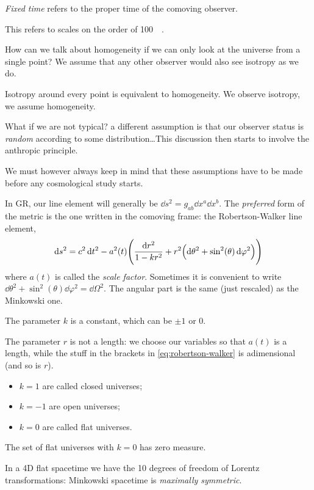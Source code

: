 \documentclass[main.tex]{subfiles}
\begin{document}
\emph{Fixed time} refers to the proper time of the comoving observer.

This refers to scales on the order of \SI{100}{\mega\parsec}.

How can we talk about homogeneity if we can only look at the universe from a single point? We assume that any other observer would also see isotropy as we do.

Isotropy around every point is equivalent to homogeneity. We observe isotropy, we assume homogeneity.

What if we are not typical? a different assumption is that our observer status is \emph{random} according to some distribution\dots This discussion then starts to involve the anthropic principle.

We must however always keep in mind that these assumptions have to be made before any cosmological study starts.

In GR, our line element will generally be \(\dd{s^2} = g_{ab} \dd{x^a} \dd{x^b} \). The \emph{preferred} form of the metric is the one written in the comoving frame: the Robertson-Walker line element,
%
\begin{equation} \label{eq:robertson-walker}
  \dd{s^2} = c^2 \dd{t^2} - a^2(t) \qty(\frac{\dd{r^2}}{1 - k r^2} + r^2 \qty(\dd{\theta^2} + \sin^2(\theta) \dd{\varphi^2} ) )
\end{equation}
%
where \(a(t)\) is called the \emph{scale factor}. Sometimes it is convenient to write \(\dd{\theta^2} + \sin^2(\theta) \dd{\varphi^2} = \dd{\Omega^2}\).
The angular part is the same (just rescaled) as the Minkowski one.

The parameter \(k\) is a constant, which can be \(\pm 1\) or \(0\).

The parameter \(r\) is not a length: we choose our variables so that \(a(t)\)  is a length, while the stuff in the brackets in \eqref{eq:robertson-walker} is adimensional (and so is \(r\)).

\begin{itemize}
    \item \(k=1\) are called closed universes;
    \item \(k=-1\) are open universes;
    \item \(k=0\) are called flat universes.
\end{itemize}

The set of flat universes with \(k=0\) has zero measure.

In a 4D flat spacetime we have the 10 degrees of freedom of Lorentz transformations: Minkowski spacetime is \emph{maximally symmetric}.
\end{document}
